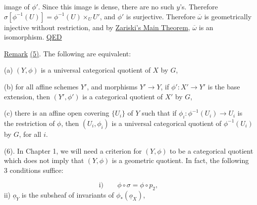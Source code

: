 
image of $\phi'$. Since this image is dense, there are no such $y$'s.
Therefore $\sigma[\phi^{-1}(U)]=\phi^{-1}(U)\times_U U'$, and $\phi'$ is surjective.
Therefore $\overline\omega$ is geometrically injective without restriction, and by \uline{Zariski's Main Theorem}, $\overline\omega$ is an isomorphism. \uline{QED}
\margin{!}

\uline{Remark} \uline{(5)}. The following are equivalent:

(a) $(Y,\phi)$ is a universal categorical quotient of $X$ by $G$,

(b) for all affine schemes $Y'$, and morphisms $Y'\longrightarrow Y$, if $\phi':X'\to Y'$ is the base extension, then $(Y',\phi')$ is a categorical quotient of $X'$ by $G$,

(c) there is an affine open covering $\{U_i\}$ of $Y$ such that if $\phi_i:\phi^{-1}(U_i)\longrightarrow U_i$ is the restriction of $\phi$, then $(U_i,\phi_i)$ is a universal categorical quotient of $\phi^{-1}(U_i)$ by $G$, for all $i$.

(6). In Chapter 1, we will need a criterion for $(Y,\phi)$ to be a categorical quotient which does not imply that $(Y,\phi)$ is a geometric quotient. In fact, the following 3 conditions suffice:

\[
\text{i)}\qquad\phi\circ\sigma=\phi\circ p_2,
\]
ii) $\underline o_Y$ is the subsheaf of invariants of $\phi_*(\underline o_X)$,

